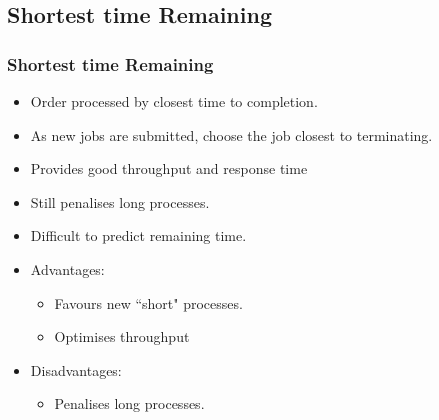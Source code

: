 \documentclass{beamer}
\begin{document}
\subsection{Shortest time Remaining}
\begin{frame}
\frametitle{Shortest time Remaining}
\begin{itemize}
\item Order processed by closest time to completion.
\item As new jobs are submitted, choose the job closest to terminating.
\item Provides good throughput and response time
\item Still penalises long processes.
\item Difficult to predict remaining time.
\item Advantages:
\begin{itemize}
\item Favours new ``short" processes.
\item Optimises throughput
\end{itemize}
\item Disadvantages:
\begin{itemize}
\item Penalises long processes.
\end{itemize}
\end{itemize}
\end{frame}
\end{document}
